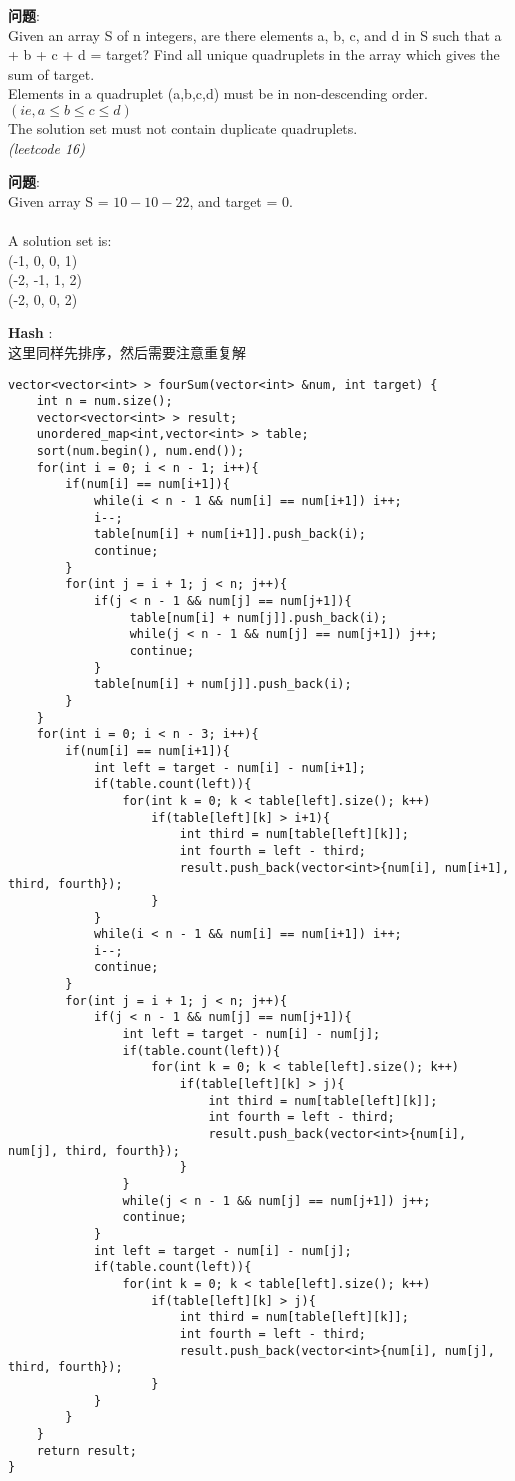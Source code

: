    
\begin{description}
    \item{\textbf{问题}}:\\
Given an array S of n integers, are there elements a, b, c, and d in S such that a + b + c + d = target? Find all unique quadruplets in the array which gives the sum of target.\\
Elements in a quadruplet (a,b,c,d) must be in non-descending order. $(ie, a ≤ b ≤ c ≤ d)$ \\
The solution set must not contain duplicate quadruplets. \\
\textit{(leetcode 16)}
    \item{\textbf{问题}}:\\
Given array S = ${1 0 -1 0 -2 2}$, and target = 0. \\
\\
    A solution set is: \\
    (-1,  0, 0, 1) \\
    (-2, -1, 1, 2) \\
    (-2,  0, 0, 2) \\
    \item{\textbf{Hash}} : 
    \\这里同样先排序，然后需要注意重复解
    \begin{lstlisting}
vector<vector<int> > fourSum(vector<int> &num, int target) {
	int n = num.size();
	vector<vector<int> > result;
	unordered_map<int,vector<int> > table;
	sort(num.begin(), num.end());
	for(int i = 0; i < n - 1; i++){
		if(num[i] == num[i+1]){
			while(i < n - 1 && num[i] == num[i+1]) i++;
			i--;
			table[num[i] + num[i+1]].push_back(i);
			continue;
		}
		for(int j = i + 1; j < n; j++){
			if(j < n - 1 && num[j] == num[j+1]){
				 table[num[i] + num[j]].push_back(i);
				 while(j < n - 1 && num[j] == num[j+1]) j++;
				 continue;
			}
			table[num[i] + num[j]].push_back(i);
		}
	}
	for(int i = 0; i < n - 3; i++){
		if(num[i] == num[i+1]){
			int left = target - num[i] - num[i+1];
			if(table.count(left)){
				for(int k = 0; k < table[left].size(); k++)
					if(table[left][k] > i+1){
						int third = num[table[left][k]];
						int fourth = left - third;
						result.push_back(vector<int>{num[i], num[i+1], third, fourth});
					}
			}
			while(i < n - 1 && num[i] == num[i+1]) i++;
			i--;
			continue;
		}
		for(int j = i + 1; j < n; j++){
			if(j < n - 1 && num[j] == num[j+1]){
				int left = target - num[i] - num[j];
				if(table.count(left)){
					for(int k = 0; k < table[left].size(); k++)
						if(table[left][k] > j){
							int third = num[table[left][k]];
							int fourth = left - third;
							result.push_back(vector<int>{num[i], num[j], third, fourth});
						}
				}
				while(j < n - 1 && num[j] == num[j+1]) j++;
				continue;
			}
			int left = target - num[i] - num[j];
			if(table.count(left)){
				for(int k = 0; k < table[left].size(); k++)
					if(table[left][k] > j){
						int third = num[table[left][k]];
						int fourth = left - third;
						result.push_back(vector<int>{num[i], num[j], third, fourth});
					}
			}
		}
	}
	return result;
}
    \end{lstlisting}
\end{description}
